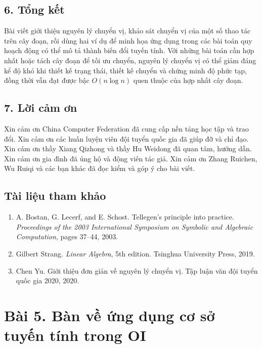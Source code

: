 \documentclass[11pt]{article}
\begin{document}
\subsection*{6. Tổng kết}

Bài viết giới thiệu nguyên lý chuyển vị, khảo sát chuyển vị của một số thao tác
trên cây đoạn, rồi dùng hai ví dụ để minh họa ứng dụng trong các bài toán quy
hoạch động có thể mô tả thành biến đổi tuyến tính. Với những bài toán cần hợp
nhất hoặc tách cây đoạn để tối ưu chuyển, nguyên lý chuyển vị có thể giảm đáng
kể độ khó khi thiết kế trạng thái, thiết kế chuyển và chứng minh độ phức tạp,
đồng thời vẫn đạt được bậc \(O(n\log n)\) quen thuộc của hợp nhất cây đoạn.

\subsection*{7. Lời cảm ơn}

Xin cảm ơn China Computer Federation đã cung cấp nền tảng học tập và trao đổi.
Xin cảm ơn các huấn luyện viên đội tuyển quốc gia đã giúp đỡ và chỉ đạo. Xin
cảm ơn thầy Xiang Qizhong và thầy Hu Weidong đã quan tâm, hướng dẫn. Xin cảm
ơn gia đình đã ủng hộ và động viên tác giả. Xin cảm ơn Zhang Ruichen, Wu Ruiqi
và các bạn khác đã đọc kiểm và góp ý cho bài viết.

\subsection*{Tài liệu tham khảo}

\begin{enumerate}
  \item A. Bostan, G. Lecerf, and E. Schost. Tellegen's principle into
  practice. \emph{Proceedings of the 2003 International Symposium on Symbolic
  and Algebraic Computation}, pages 37--44, 2003.
  \item Gilbert Strang. \emph{Linear Algebra}, 5th edition. Tsinghua University
  Press, 2019.
  \item Chen Yu. Giới thiệu đơn giản về nguyên lý chuyển vị. Tập luận văn đội
  tuyển quốc gia 2020, 2020.
\end{enumerate}

\section*{Bài 5. Bàn về ứng dụng cơ sở tuyến tính trong OI}
\end{document}
